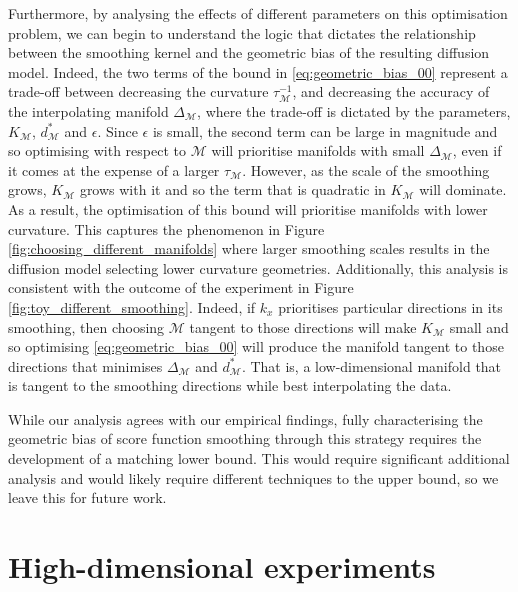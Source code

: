 \documentclass[10pt]{article}
\theoremstyle{plain}
\theoremstyle{definition}
\theoremstyle{remark}
\newcommand{\M}{{\mathcal{M}}}
\newcommand{\gap}{\Delta_\M}
\begin{document}
Furthermore, by analysing the effects of different parameters on this optimisation problem, we can begin to understand the logic that dictates the relationship between the smoothing kernel and the geometric bias of the resulting diffusion model. Indeed, the two terms of the bound in \eqref{eq:geometric_bias_00} represent a trade-off between decreasing the curvature \(\tau_\M^{-1}\), and decreasing the accuracy of the interpolating manifold \(\gap\), where the trade-off is dictated by the parameters, \(K_\M\), \(d_\M^*\) and \(\epsilon\). Since \(\epsilon\) is small, the second term can be large in magnitude and so optimising with respect to \(\M\) will prioritise manifolds with small \(\Delta_\M\), even if it comes at the expense of a larger \(\tau_\M\). However, as the scale of the smoothing grows, \(K_\M\) grows with it and so the term that is quadratic in \(K_\M\) will dominate. As a result, the optimisation of this bound will prioritise manifolds with lower curvature. This captures the phenomenon in Figure \ref{fig:choosing_different_manifolds} where larger smoothing scales results in the diffusion model selecting lower curvature geometries. Additionally, this analysis is consistent with the outcome of the experiment in Figure \ref{fig:toy_different_smoothing}. Indeed, if \(k_x\) prioritises particular directions in its smoothing, then choosing \(\M\) tangent to those directions will make \(K_\M\) small and so optimising \eqref{eq:geometric_bias_00} will produce the manifold tangent to those directions that minimises \(\gap\) and \(d^*_\M\). That is, a low-dimensional manifold that is tangent to the smoothing directions while best interpolating the data.

While our analysis agrees with our empirical findings, fully characterising the geometric bias of score function smoothing through this strategy requires the development of a matching lower bound. This  would require significant additional analysis and would likely require different techniques to the upper bound, so we leave this for future work.


\section{High-dimensional experiments}\label{sec:high-dim-experiments}
\end{document}
